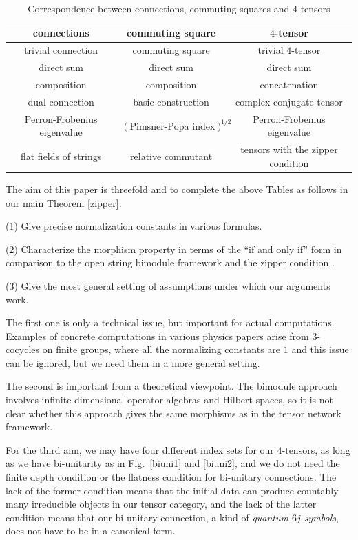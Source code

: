\documentclass[12pt]{article}
\begin{document}
\begin{table}[H]
\centering
\caption{Correspondence between connections, commuting 
squares and $4$-tensors
\label{corresp2}}
\begin{tabular}{|c|c|c|}
\hline
connections & commuting square & $4$-tensor \\ \hline \hline
trivial connection & commuting square & trivial $4$-tensor \\ \hline
direct sum & direct sum& direct sum \\\hline
composition & composition & concatenation \\ \hline
dual connection & basic construction & complex conjugate tensor \\ \hline
Perron-Frobenius eigenvalue & 
$(\text{Pimsner-Popa\ index})^{1/2}$ & Perron-Frobenius eigenvalue \\ \hline
flat fields of strings & relative commutant &
tensors with the zipper condition \\ \hline
\end{tabular}
\end{table}

The aim of this paper is threefold and to complete the
above Tables as follows in our main Theorem \ref{zipper}.

(1) Give precise normalization constants in various formulas.

(2) Characterize the morphism property in terms of the ``if and
only if'' form in comparison to the open string bimodule
framework and the zipper condition \cite[(2)]{BMWSHV}.

(3) Give the most general setting of assumptions under which
our arguments work.

The first one is only a technical issue, but important for
actual computations.  Examples of concrete computations
in various physics papers arise from $3$-cocycles on finite groups,
where all the normalizing constants are $1$ and this issue
can be ignored, but we need them in a more general setting.

The second is important from a theoretical viewpoint.  The
bimodule approach involves infinite dimensional operator
algebras and Hilbert spaces, so it is not clear whether
this approach gives the same morphisms as in the tensor
network framework.

For the third aim, we may have four different index sets
for our $4$-tensors, as long as we have bi-unitarity
as in Fig.~\ref{biuni1} and \ref{biuni2}, and we do not need
the finite depth condition or the flatness condition \cite{EK1}
for bi-unitary connections. The lack of the former condition
means that the initial data can produce 
countably many irreducible objects in our tensor category,
and the lack of the latter condition means that our bi-unitary connection,
a kind of \textit{quantum $6j$-symbols}, does not have to be
in a canonical form.
\end{document}
